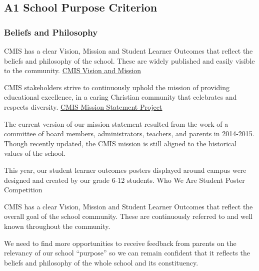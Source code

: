 \subsection{A1 School Purpose Criterion}
\subsubsection{Beliefs and Philosophy}



\begin{findings}
CMIS has a clear Vision, Mission and Student Learner Outcomes that reflect the beliefs and philosophy of the school. These are widely published and easily visible to the community. \href{http://cmis.ac.th/about/vision}{CMIS Vision and Mission} 

CMIS stakeholders strive to continuously uphold the mission of providing educational excellence, in a caring Christian community that celebrates and respects diversity. \href{https://docs.google.com/a/cmis.ac.th/presentation/d/1EJ3zT-xwUj2W--v5mTN6xWOqewtvhXrhTxXuoR1HyAg/edit?usp=sharing}{CMIS Mission Statement Project} 

The current version of our mission statement resulted from the work of a committee of board members, administrators, teachers, and parents in 2014-2015. Though recently updated, the CMIS mission is still aligned to the historical values of the school.

This year, our student learner outcomes posters displayed around campus were designed and created by our grade 6-12 students. Who We Are Student Poster Competition 


CMIS has a clear Vision, Mission and Student Learner Outcomes that reflect the overall goal of the school community. These are continuously referred to and well known throughout the community. 

We need to find more opportunities to receive feedback from parents on the relevancy of our school “purpose” so we can remain confident that it reflects the beliefs and philosophy of the whole school and its constituency.
\end{findings}

